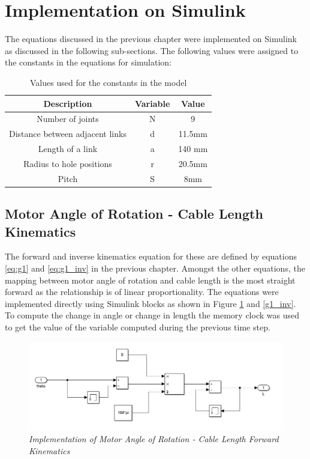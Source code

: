 \documentclass[a4paper,12pt]{report}
\begin{document}
\section{Implementation on Simulink}
The equations discussed in the previous chapter were implemented on Simulink as discussed in the following sub-sections.
The following values were assigned to the constants in the equations for simulation:
\begin{table}[h!]
\centering
\begin{tabular}{|c|c|c|}
	\hline
	\textbf{Description} &\textbf{Variable} & \textbf{Value} \\
	\hline
	Number of joints & N & 9\\
	Distance between adjacent links & d & 11.5mm\\
	Length of a link & a & 140 mm\\
	Radius to hole positions & r & 20.5mm\\
	Pitch & S & 8mm\\
	\hline
\end{tabular}
\caption{Values used for the constants in the model}
\label{params_table}
\end{table}

\subsection{Motor Angle of Rotation - Cable Length Kinematics}
The forward and inverse kinematics equation for these are defined  by equations \ref{eq:g1} and \ref{eq:g1_inv} in the previous chapter. Amongst the other equations, the mapping between motor angle of rotation and cable length is the most straight forward as the relationship is of linear proportionality. The equations were implemented directly using Simulink blocks as shown in Figure \ref{g1} and \ref{g1_inv}. To compute the change in angle or change in length the memory clock was used to get the value of the variable computed during the previous time step.
\begin{figure}[H]
	\centering
	\includegraphics[width=\textwidth]{images/g1.png}
	\caption{\textit{Implementation of Motor Angle of Rotation - Cable Length Forward Kinematics }}
	\label{g1}
\end{figure}
\end{document}
